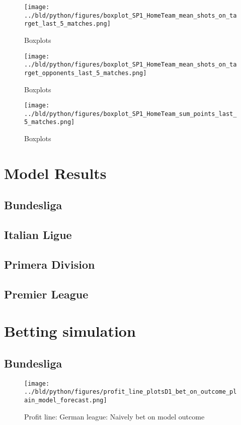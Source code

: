\documentclass[11pt, a4paper, leqno]{article}
\begin{document}
\begin{figure}[H]
    \centering
    \texttt{[image: ../bld/python/figures/boxplot\_SP1\_HomeTeam\_mean\_shots\_on\_target\_last\_5\_matches.png]}
    \caption{Boxplots}
    \label{fig:figure2}
\end{figure}

\begin{figure}[H]
    \centering
    \texttt{[image: ../bld/python/figures/boxplot\_SP1\_HomeTeam\_mean\_shots\_on\_target\_opponents\_last\_5\_matches.png]}
    \caption{Boxplots}
    \label{fig:figure2}
\end{figure}

\begin{figure}[H]
    \centering
    \texttt{[image: ../bld/python/figures/boxplot\_SP1\_HomeTeam\_sum\_points\_last\_5\_matches.png]}
    \caption{Boxplots}
    \label{fig:figure2}
\end{figure}



\section{Model Results}
\subsection{Bundesliga}

\subsection{Italian Ligue }

\subsection{Primera Division}

\subsection{Premier League}

\section{Betting simulation}
\subsection{Bundesliga}
\begin{figure}[H]
    \centering
    \texttt{[image: ../bld/python/figures/profit\_line\_plotsD1\_bet\_on\_outcome\_plain\_model\_forecast.png]}
    \caption{Profit line: German league: Naively bet on model outcome}
    \label{fig:figure2}
\end{figure}
\end{document}
